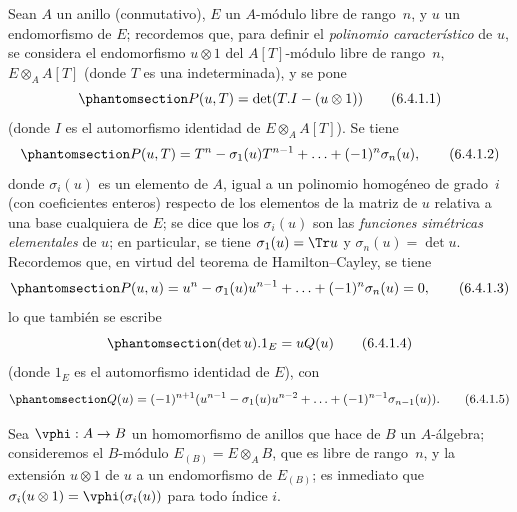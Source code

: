 \documentclass[oneside,10pt]{amsart}
\makeatletter
\newcommand{\ega@arrow}[2]{\mathchoice{#1}{#2}{#2}{#2}}
\renewcommand{\to}{\ega@arrow{\longrightarrow}{\rightarrow}}
\newcommand{\oldpage}[2][]{\marginnote{\normalfont\footnotesize\textbf{#1}~|~#2}\ignorespaces}
\let\EGAOriginalLabel\label
\renewcommand{\label}[1]{\phantomsection\EGAOriginalLabel{#1}}
\makeatother
\begin{document}
\begin{env}[6.4.1]
\label{II.6.4.1}
Sean $A$ un anillo (conmutativo), $E$ un $A$-módulo libre de rango~$n$, y $u$ un endomorfismo de $E$;
recordemos que, para definir el \emph{polinomio característico} de $u$, se considera el endomorfismo $u\otimes1$ del $A[T]$-módulo libre de rango~$n$, $E\otimes_A A[T]$ (donde $T$ es una indeterminada), y se pone
\[
\label{II.6.4.1.1}
  P(u,T) = \det(T.I-(u\otimes 1))
\tag{6.4.1.1}
\]
(donde $I$ es el automorfismo identidad de $E\otimes_A A[T]$).
Se tiene
\[
\label{II.6.4.1.2}
  P(u,T) = T^n - \sigma_1(u)T^{n-1} + \ldots + (-1)^n\sigma_n(u),
\tag{6.4.1.2}
\]
donde $\sigma_i(u)$ es un elemento de $A$, igual a un polinomio homogéneo de grado~$i$ (con coeficientes enteros) respecto de los elementos de la matriz de $u$ relativa a una base cualquiera de $E$;
se dice que los $\sigma_i(u)$ son las \emph{funciones simétricas elementales} de $u$;
en particular, se tiene $\sigma_1(u)=\Tr u$ y $\sigma_n(u)=\det u$.
Recordemos que, en virtud del teorema de Hamilton--Cayley, se tiene
\[
\label{II.6.4.1.3}
  P(u,u) = u^n - \sigma_1(u)u^{n-1} + \ldots + (-1)^n\sigma_n(u) = 0,
\tag{6.4.1.3}
\]
\oldpage[II]{121}
lo que también se escribe
\[
\label{II.6.4.1.4}
  (\det u).1_E = uQ(u)
\tag{6.4.1.4}
\]
(donde $1_E$ es el automorfismo identidad de $E$), con
\[
\label{II.6.4.1.5}
  Q(u) = (-1)^{n+1}(u^{n-1}-\sigma_1(u)u^{n-2}+\ldots+(-1)^{n-1}\sigma_{n-1}(u)).
\tag{6.4.1.5}
\]

Sea $\vphi:A\to B$ un homomorfismo de anillos que hace de $B$ un $A$-álgebra;
consideremos el $B$-módulo $E_{(B)}=E\otimes_A B$, que es libre de rango~$n$, y la extensión $u\otimes1$ de $u$ a un endomorfismo de $E_{(B)}$;
es inmediato que $\sigma_i(u\otimes1)=\vphi(\sigma_i(u))$ para todo índice $i$.
\end{env}
\end{document}
